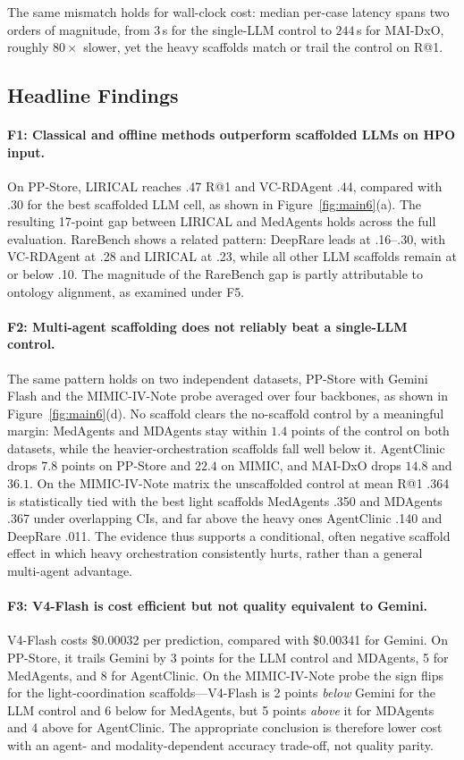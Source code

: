 The same mismatch holds for wall-clock cost: median per-case latency spans two orders of magnitude, from $3$\,s for the single-LLM control to $244$\,s for MAI-DxO, roughly $80\times$ slower, yet the heavy scaffolds match or trail the control on R@1.

\subsection{Headline Findings}
\label{sec-6-4}

\paragraph{F1: Classical and offline methods outperform scaffolded LLMs on HPO input.}
On PP-Store, LIRICAL reaches .47 R@1 and VC-RDAgent .44, compared with .30 for the best scaffolded LLM cell, as shown in Figure~\ref{fig:main6}(a). The resulting 17-point gap between LIRICAL and MedAgents holds across the full evaluation. RareBench shows a related pattern: DeepRare leads at .16--.30, with VC-RDAgent at .28 and LIRICAL at .23, while all other LLM scaffolds remain at or below .10. The magnitude of the RareBench gap is partly attributable to ontology alignment, as examined under F5.

\paragraph{F2: Multi-agent scaffolding does not reliably beat a single-LLM control.}
The same pattern holds on two independent datasets, PP-Store with Gemini Flash and the MIMIC-IV-Note probe averaged over four backbones, as shown in Figure~\ref{fig:main6}(d). No scaffold clears the no-scaffold control by a meaningful margin: MedAgents and MDAgents stay within $1.4$ points of the control on both datasets, while the heavier-orchestration scaffolds fall well below it. AgentClinic drops $7.8$ points on PP-Store and $22.4$ on MIMIC, and MAI-DxO drops $14.8$ and $36.1$. On the MIMIC-IV-Note matrix the unscaffolded control at mean R@1 .364 is statistically tied with the best light scaffolds MedAgents .350 and MDAgents .367 under overlapping CIs, and far above the heavy ones AgentClinic .140 and DeepRare .011. The evidence thus supports a conditional, often negative scaffold effect in which heavy orchestration consistently hurts, rather than a general multi-agent advantage.

\paragraph{F3: V4-Flash is cost efficient but not quality equivalent to Gemini.}
V4-Flash costs \$0.00032 per prediction, compared with \$0.00341 for Gemini. On PP-Store, it trails Gemini by 3 points for the LLM control and MDAgents, 5 for MedAgents, and 8 for AgentClinic. On the MIMIC-IV-Note probe the sign flips for the light-coordination scaffolds---V4-Flash is 2 points \emph{below} Gemini for the LLM control and 6 below for MedAgents, but 5 points \emph{above} it for MDAgents and 4 above for AgentClinic. The appropriate conclusion is therefore lower cost with an agent- and modality-dependent accuracy trade-off, not quality parity.

